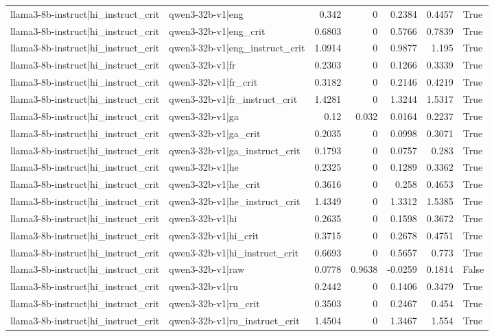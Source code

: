 \begin{table}
\begin{tabular}{l l r r r r l}
llama3-8b-instruct|hi_instruct_crit & qwen3-32b-v1|eng & 0.342 & 0 & 0.2384 & 0.4457 & True \\
llama3-8b-instruct|hi_instruct_crit & qwen3-32b-v1|eng_crit & 0.6803 & 0 & 0.5766 & 0.7839 & True \\
llama3-8b-instruct|hi_instruct_crit & qwen3-32b-v1|eng_instruct_crit & 1.0914 & 0 & 0.9877 & 1.195 & True \\
llama3-8b-instruct|hi_instruct_crit & qwen3-32b-v1|fr & 0.2303 & 0 & 0.1266 & 0.3339 & True \\
llama3-8b-instruct|hi_instruct_crit & qwen3-32b-v1|fr_crit & 0.3182 & 0 & 0.2146 & 0.4219 & True \\
llama3-8b-instruct|hi_instruct_crit & qwen3-32b-v1|fr_instruct_crit & 1.4281 & 0 & 1.3244 & 1.5317 & True \\
llama3-8b-instruct|hi_instruct_crit & qwen3-32b-v1|ga & 0.12 & 0.032 & 0.0164 & 0.2237 & True \\
llama3-8b-instruct|hi_instruct_crit & qwen3-32b-v1|ga_crit & 0.2035 & 0 & 0.0998 & 0.3071 & True \\
llama3-8b-instruct|hi_instruct_crit & qwen3-32b-v1|ga_instruct_crit & 0.1793 & 0 & 0.0757 & 0.283 & True \\
llama3-8b-instruct|hi_instruct_crit & qwen3-32b-v1|he & 0.2325 & 0 & 0.1289 & 0.3362 & True \\
llama3-8b-instruct|hi_instruct_crit & qwen3-32b-v1|he_crit & 0.3616 & 0 & 0.258 & 0.4653 & True \\
llama3-8b-instruct|hi_instruct_crit & qwen3-32b-v1|he_instruct_crit & 1.4349 & 0 & 1.3312 & 1.5385 & True \\
llama3-8b-instruct|hi_instruct_crit & qwen3-32b-v1|hi & 0.2635 & 0 & 0.1598 & 0.3672 & True \\
llama3-8b-instruct|hi_instruct_crit & qwen3-32b-v1|hi_crit & 0.3715 & 0 & 0.2678 & 0.4751 & True \\
llama3-8b-instruct|hi_instruct_crit & qwen3-32b-v1|hi_instruct_crit & 0.6693 & 0 & 0.5657 & 0.773 & True \\
llama3-8b-instruct|hi_instruct_crit & qwen3-32b-v1|raw & 0.0778 & 0.9638 & -0.0259 & 0.1814 & False \\
llama3-8b-instruct|hi_instruct_crit & qwen3-32b-v1|ru & 0.2442 & 0 & 0.1406 & 0.3479 & True \\
llama3-8b-instruct|hi_instruct_crit & qwen3-32b-v1|ru_crit & 0.3503 & 0 & 0.2467 & 0.454 & True \\
llama3-8b-instruct|hi_instruct_crit & qwen3-32b-v1|ru_instruct_crit & 1.4504 & 0 & 1.3467 & 1.554 & True \\

\end{tabular}
\end{table}
